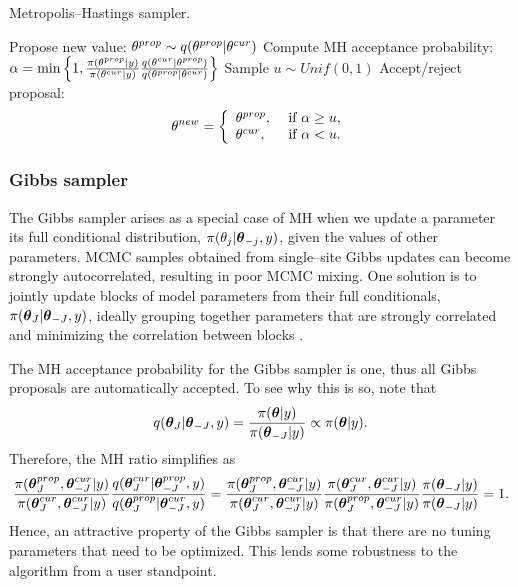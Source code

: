 \begin{algorithm}[htbp]
	\caption{Metropolis--Hastings sampler.}
	\label{alg:metropolis_hastings}
	\begin{algorithmic}[1]
		\State Propose new value: $ \theta^{prop} \sim q(\theta^{prop}|\theta^{cur}) $
		\State Compute MH acceptance probability: $ \alpha = \min\left \lbrace 1, \frac{\pi(\theta^{prop}|y)}{\pi(\theta^{cur}|y)}\frac{q(\theta^{cur}|\theta^{prop})}{q(\theta^{prop}|\theta^{cur})}\right \rbrace $
		\State Sample $ u\sim Unif(0,1) $
		\State Accept/reject proposal: \vspace{-0.1in}
			\begin{equation*}
			\theta^{new} = \left\lbrace \begin{array}{ll}
			\theta^{prop},&\ \text{if}\ \alpha \geq u,\\
			\theta^{cur},&\ \text{if}\ \alpha < u.
			\end{array} \right.
			\end{equation*}
		\EndProcedure
	\end{algorithmic}
\end{algorithm}

\subsubsection{Gibbs sampler}
\label{subsubsec:gibbs}

The Gibbs sampler \cite{geman1984stochastic} arises as a special case of MH when we update a parameter  its full conditional distribution, $ \pi(\theta_j|\boldsymbol{\theta}_{-j},y) $, given the values of other parameters. MCMC samples obtained from single--site Gibbs updates can become strongly autocorrelated, resulting in poor MCMC mixing. One solution is to jointly update blocks of model parameters from their full conditionals, $ \pi(\boldsymbol{\theta}_{J}|\boldsymbol{\theta}_{-J},y) $, ideally grouping together parameters that are strongly correlated and minimizing the correlation between blocks \cite{knorr2002block,roberts1997updating,rue2005gaussian}.

The MH acceptance probability for the Gibbs sampler is one, thus all Gibbs proposals are automatically accepted. To see why this is so, note that $$q(\boldsymbol{\theta}_{J}|\boldsymbol{\theta}_{-J},y) = \frac{\pi(\boldsymbol{\theta}|y)}{\pi(\boldsymbol{\theta}_{-J}|y)} \propto\pi(\boldsymbol{\theta}|y).$$
Therefore, the MH ratio simplifies as
\begin{align*}
\frac{\pi(\boldsymbol{\theta}_J^{prop},\boldsymbol{\theta}_{-J}^{cur}|y)}{\pi(\boldsymbol{\theta}_J^{cur},\boldsymbol{\theta}_{-J}^{cur}|y)}\frac{q(\boldsymbol{\theta}_J^{cur}|\boldsymbol{\theta}_{-J}^{prop},y)}{q(\boldsymbol{\theta}_J^{prop}|\boldsymbol{\theta}_{-J}^{cur},y)} &= \frac{\pi(\boldsymbol{\theta}_J^{prop},\boldsymbol{\theta}_{-J}^{cur}|y)}{\pi(\boldsymbol{\theta}_J^{cur},\boldsymbol{\theta}_{-J}^{cur}|y)}\frac{\pi(\boldsymbol{\theta}_J^{cur},\boldsymbol{\theta}_{-J}^{cur}|y)}{\pi(\boldsymbol{\theta}_J^{prop},\boldsymbol{\theta}_{-J}^{cur}|y)}\frac{\pi(\boldsymbol{\theta}_{-J}|y)}{\pi(\boldsymbol{\theta}_{-J}|y)} = 1. \\
\end{align*}
Hence, an attractive property of the Gibbs sampler is that there are no tuning parameters that need to be optimized. This lends some robustness to the algorithm from a user standpoint.  

